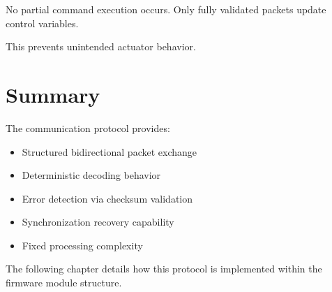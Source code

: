 No partial command execution occurs.  
Only fully validated packets update control variables.

This prevents unintended actuator behavior.


\section{Summary}

The communication protocol provides:

\begin{itemize}
	\item Structured bidirectional packet exchange
	\item Deterministic decoding behavior
	\item Error detection via checksum validation
	\item Synchronization recovery capability
	\item Fixed processing complexity
\end{itemize}

The following chapter details how this protocol is implemented within the firmware module structure.
